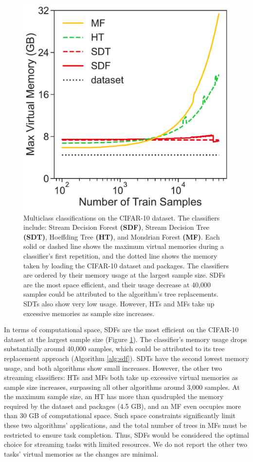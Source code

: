 \begin{figure}[!htb]
\centering
\includegraphics[width=0.4\columnwidth]{select_cifar_mem_stream}
  \caption{Multiclass classifications on the CIFAR-10 dataset. The classifiers include: Stream Decision Forest \textbf{(SDF)}, Stream Decision Tree \textbf{(SDT)}, Hoeffding Tree \textbf{(HT)}, and Mondrian Forest \textbf{(MF)}. 
  Each solid or dashed line shows the maximum virtual memories during a classifier's first repetition, and the dotted line shows the memory taken by loading the CIFAR-10 dataset and packages. The classifiers are ordered by their memory usage at the largest sample size. SDFs are the most space efficient, and their usage decrease at 40,000 samples could be attributed to the algorithm's tree replacements. SDTs also show very low usage. However, HTs and MFs take up excessive memories as sample size increases.
  }
\label{fig:select_cifar_mem_stream}
\end{figure}

In terms of computational space, SDFs are the most efficient on the CIFAR-10 dataset at the largest sample size (Figure \ref{fig:select_cifar_mem_stream}). The classifier's memory usage drops substantially around 40,000 samples, which could be attributed to its tree replacement approach (Algorithm \ref{alg:sdf}). SDTs have the second lowest memory usage, and both algorithms show small increases.
However, the other two streaming classifiers: HTs and MFs both take up excessive virtual memories as sample size increases, surpassing all other algorithms around 3,000 samples.
At the maximum sample size, an HT has more than quadrupled the memory required by the dataset and packages (4.5 GB), and an MF even occupies more than 30 GB of computational space. Such space constraints significantly limit these two algorithms' applications, and the total number of trees in MFs must be restricted to ensure task completion. 
Thus, SDFs would be considered the optimal choice for streaming tasks with limited resources. We do not report the other two tasks' virtual memories as the changes are minimal. 

